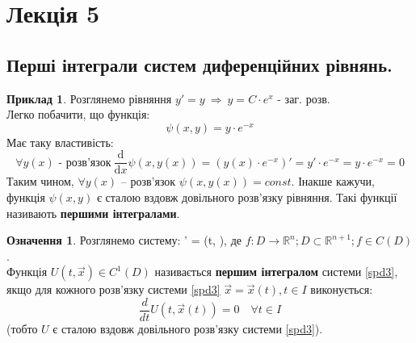 \documentclass[14pt,a4paper]{scrartcl}
\theoremstyle{definition}
\newtheorem*{defo}{Означення}
\newtheorem*{example}{Приклад}
\theoremstyle{definition}
\theoremstyle{definition}
\begin{document}
\newpage

\section{Лекція 5}
\subsection{Перші інтеграли систем диференційних рівнянь.}
\begin{example}
 Розглянемо рівняння
 $y' = y \ \Longrightarrow \  y =  C \cdot e^x $ - заг. розв.\\
 Легко побачити, що функція:
 $$
 \psi (x,y)  = y \cdot e^{-x}
 $$
 Має таку властивість:
 $$
 \forall y(x) \text{ - розв'язок} \ \dfrac{\mathrm{d}}{\mathrm{d}x} \psi(x, y(x)) = (y(x)\cdot e^{-x})' = y' \cdot e^{-x}  = y \cdot e^{-x} = 0
 $$
 Таким чином, $\forall y(x) $ -- розв'язок $\psi (x, y(x)) = const$. Інакше кажучи, функція $\psi(x,y) $ є сталою вздовж довільного розв'язку рівняння. Такі функції називають \textbf{першими інтегралами}.
\end{example}
\begin{defo}
Розглянемо систему:
  \be\label{spd3}
  ' =  (t, ),
  \ee
  де $f: D \to \mathbb{R}^n ; D \subset \mathbb{R}^{n+1}; f \in C(D)$.\\
  Функція $U(t, \overrightarrow{x}) \in C^1 (D)$ називається \textbf{першим інтегралом} системи \eqref{spd3}, якщо для кожного розв'язку системи \eqref{spd3} $\overrightarrow{x} = \overrightarrow{x}(t), t \in I$ виконується:
$$
\frac{d}{d t} U ( t, \overrightarrow{x}(t)) = 0 \quad \forall t \in I
$$
(тобто $U$ є сталою вздовж довільного розв'язку системи \eqref{spd3}).
\end{defo}
\end{document}
